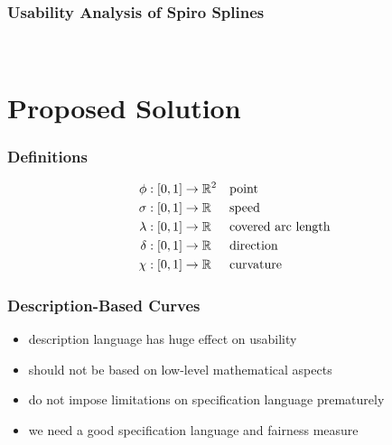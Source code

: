 \documentclass[mathserif]{beamer}
\begin{document}
		\begin{frame}
			\frametitle{Usability Analysis of Spiro Splines}
			\\
		\end{frame}
	
	\section{Proposed Solution}

		\begin{frame}
			\frametitle{Definitions}
			\begin{align*}
				\phi    & : \left[ 0,1 \right] \rightarrow \mathbb{R}^{2} && \text{point}\\
				\sigma  & : \left[ 0,1 \right] \rightarrow \mathbb{R}   && \text{speed}\\
				\lambda & : \left[ 0,1 \right] \rightarrow \mathbb{R}   && \text{covered arc length}\\
				\delta  & : \left[ 0,1 \right] \rightarrow \mathbb{R}   && \text{direction}\\
				\chi    & : \left[ 0,1 \right] \rightarrow \mathbb{R}   && \text{curvature}
			\end{align*}
		\end{frame}

		\begin{frame}
			\frametitle{Description-Based Curves}
			\begin{itemize}
				\item description language has huge effect on usability
				\item should not be based on low-level mathematical aspects %
				\item do not impose limitations on specification language prematurely %
				\item we need a good specification language and fairness measure
			\end{itemize}
		\end{frame}
\end{document}
